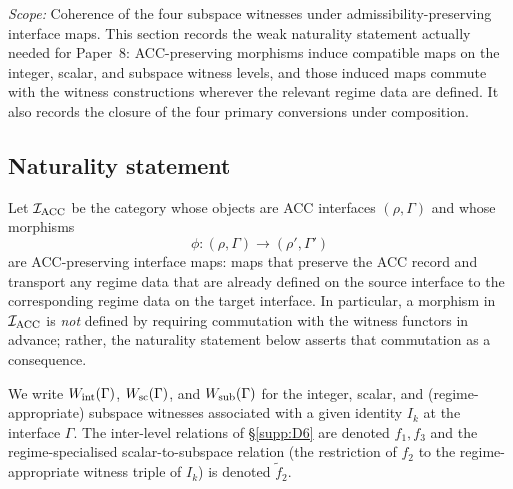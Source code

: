 \documentclass[11pt]{article}
\theoremstyle{plain}
\theoremstyle{definition}
\theoremstyle{remark}
\begin{document}
\noindent\textit{Scope:} Coherence of the four subspace witnesses under admissibility-preserving interface maps.  This section records the weak naturality statement actually needed for Paper~8: ACC-preserving morphisms induce compatible maps on the integer, scalar, and subspace witness levels, and those induced maps commute with the witness constructions wherever the relevant regime data are defined.  It also records the closure of the four primary conversions under composition.

\bigskip

\subsection{Naturality statement}\label{supp:F1}

Let $\mathcal{I}_{\rm ACC}$ be the category whose objects are ACC interfaces $(\rho,\Gamma)$ and whose morphisms
\[
  \phi : (\rho,\Gamma)\to(\rho',\Gamma')
\]
are ACC-preserving interface maps: maps that preserve the ACC record and transport any regime data that are already defined on the source interface to the corresponding regime data on the target interface.  In particular, a morphism in $\mathcal{I}_{\rm ACC}$ is \emph{not} defined by requiring commutation with the witness functors in advance; rather, the naturality statement below asserts that commutation as a consequence.

We write $W_{\rm int}(\Gamma)$, $W_{\rm sc}(\Gamma)$, and $W_{\rm sub}(\Gamma)$ for the integer, scalar, and (regime-appropriate) subspace witnesses associated with a given identity $I_k$ at the interface $\Gamma$.  The inter-level relations of \S\ref{supp:D6} are denoted $f_1, f_3$ and the regime-specialised scalar-to-subspace relation (the restriction of $f_2$ to the regime-appropriate witness triple of $I_k$) is denoted $\tilde{f}_2$.
\end{document}
